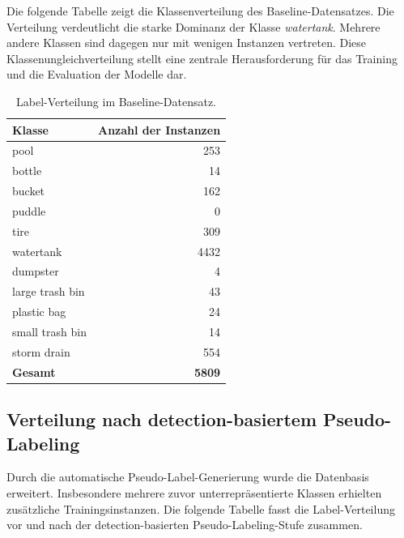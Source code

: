 Die folgende Tabelle zeigt die Klassenverteilung des Baseline-Datensatzes. Die
Verteilung verdeutlicht die starke Dominanz der Klasse \textit{watertank}. Mehrere
andere Klassen sind dagegen nur mit wenigen Instanzen vertreten. Diese
Klassenungleichverteilung stellt eine zentrale Herausforderung für das Training und
die Evaluation der Modelle dar.

\begin{table}[H]
    \centering
    \caption{Label-Verteilung im Baseline-Datensatz.}
    \label{tab:anhang_baseline_distribution}
    \begin{tabular}{lr}
        \toprule
        \textbf{Klasse} & \textbf{Anzahl der Instanzen} \\
        \midrule
        pool            & 253                           \\
        bottle          & 14                            \\
        bucket          & 162                           \\
        puddle          & 0                             \\
        tire            & 309                           \\
        watertank       & 4432                          \\
        dumpster        & 4                             \\
        large trash bin & 43                            \\
        plastic bag     & 24                            \\
        small trash bin & 14                            \\
        storm drain     & 554                           \\
        \midrule
        \textbf{Gesamt} & \textbf{5809}                 \\
        \bottomrule
    \end{tabular}
\end{table}

\subsection{Verteilung nach detection-basiertem Pseudo-Labeling}

Durch die automatische Pseudo-Label-Generierung wurde die Datenbasis erweitert.
Insbesondere mehrere zuvor unterrepräsentierte Klassen erhielten zusätzliche
Trainingsinstanzen. Die folgende Tabelle fasst die Label-Verteilung vor und nach
der detection-basierten Pseudo-Labeling-Stufe zusammen.

